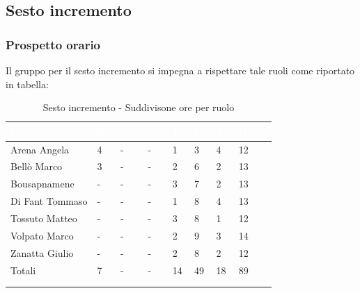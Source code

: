     \subsection{Sesto incremento} 
    {
    \subsubsection{Prospetto orario}
    {
    Il gruppo per il sesto incremento si impegna a rispettare tale ruoli come riportato in tabella:
      \setlength{\freewidth}{\dimexpr\textwidth-30\tabcolsep}
      \renewcommand{\arraystretch}{1.0}
      \setlength{\aboverulesep}{0pt}
      \setlength{\belowrulesep}{0pt}
      \begin{longtable}{C{.4\freewidth} C{.1\freewidth} C{.1\freewidth} C{.1\freewidth} C{.1\freewidth} C{.1\freewidth} C{.1\freewidth} C{.1\freewidth} C{.1\freewidth}}
      \toprule
      \textcolor{white}{\textbf{Componente}}&
      \textcolor{white}{\textbf{Re}}&
      \textcolor{white}{\textbf{Am}}&
      \textcolor{white}{\textbf{An}}&
      \textcolor{white}{\textbf{Pt}}&
      \textcolor{white}{\textbf{Pr}}&
      \textcolor{white}{\textbf{Ve}}&
      \textcolor{white}{\textbf{Ore}}\\
      \toprule
      \endhead

      Arena Angela & 4 & - & -  & 1 & 3 & 4 & 12 \\      
      Bellò Marco & 3 & - & - & 2 & 6 & 2 & 13 \\      
      Bousapnamene & - & - & - & 3 & 7 & 2 & 13 \\      
      Di Fant Tommaso & - & - & - & 1 & 8 & 4 & 13 \\      
      Tossuto Matteo & - & - & - & 3 & 8 & 1 & 12 \\      
      Volpato Marco & - & - & - & 2 & 9 & 3 & 14 \\      
      Zanatta Giulio & - & - & - & 2 & 8 & 2 & 12 \\      
      Totali & 7 & - & - & 14 & 49 & 18 & 89 \\
      \bottomrule
      \\
      \caption{Sesto incremento - Suddivisone ore per ruolo}

      \end{longtable} 

}}
